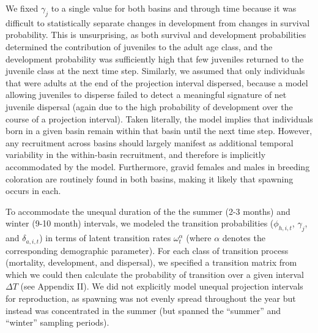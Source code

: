 \documentclass[11pt]{article}
\begin{document}
%
We fixed $\gamma_{j}$ to a single value for both basins and through time because 
it was difficult to statistically separate changes in development from changes 
in survival probability.
This is unsurprising, as both survival and development probabilities
determined the contribution of juveniles to the adult age class,
and the development probability was sufficiently 
high that few juveniles returned to the juvenile class at the next time step. 
Similarly, we assumed that only individuals that were adults at the end of the projection
interval dispersed, because a model allowing juveniles to disperse failed to detect 
a meaningful signature of net juvenile dispersal 
(again due to the high probability of development over the course of a projection interval).
Taken literally, the model implies that individuals born in a given basin
remain within that basin until the next time step.
However, any recruitment across basins should largely manifest 
as additional temporal variability in the within-basin recruitment,
and therefore is implicitly accommodated by the model.
Furthermore, gravid females and males in breeding coloration are 
routinely found in both basins, making it likely that spawning occurs in each.

To accommodate the unequal duration of the the summer (2-3 months) and winter (9-10 month)
intervals, we modeled the transition probabilities 
($\phi_{h,i,t}$, $\gamma_{j}$, and $\delta_{a,i,t}$)
in terms of latent transition rates $\omega^{\alpha}_{t}$ 
(where $\alpha$ denotes the corresponding demographic parameter).
For each class of transition process (mortality, development, and dispersal),
we specified a transition matrix from which we could then calculate
the probability of transition over a given interval $\Delta T$ 
(see Appendix II).
We did not explicitly model unequal projection intervals for reproduction,
as spawning was not evenly spread throughout the year but instead was concentrated
in the summer (but spanned the ``summer'' and ``winter'' sampling periods).
\end{document}
